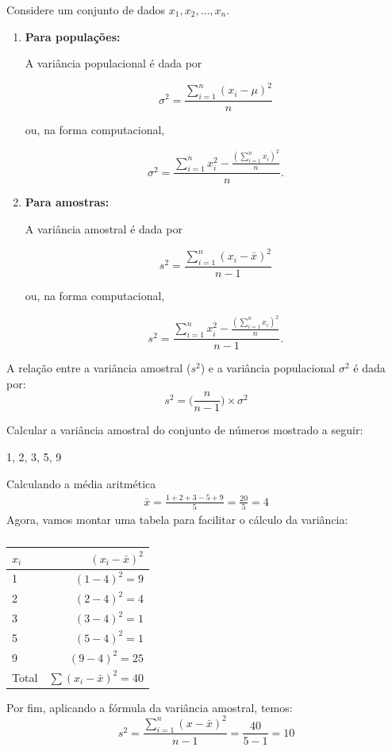 Considere um conjunto de dados 
$x_1, x_2, \dots, x_n$.

\begin{enumerate}[label=\alph*.]

\item \textbf{Para populações:}

A variância populacional é dada por

\[
\sigma^2
=
\frac{\sum_{i=1}^{n}(x_i-\mu)^2}{n}
\]

ou, na forma computacional,

\[
\sigma^2
=
\frac{
\sum_{i=1}^{n} x_i^2
-
\frac{\left(\sum_{i=1}^{n} x_i\right)^2}{n}
}{n}.
\]


\item \textbf{Para amostras:}

A variância amostral é dada por

\[
s^2
=
\frac{\sum_{i=1}^{n}(x_i-\bar{x})^2}{n-1}
\]

ou, na forma computacional,

\[
s^2
=
\frac{
\sum_{i=1}^{n} x_i^2
-
\frac{\left(\sum_{i=1}^{n} x_i\right)^2}{n}
}{n-1}.
\]

\end{enumerate}



A relação entre a variância amostral ($s^2$) e a variância populacional $\sigma^2$ é dada por:
\[
    s^2=\Bigg(\frac{n}{n-1}\Bigg)\times\sigma^2
\]
\begin{example}
    Calcular a variância amostral do conjunto de números mostrado a seguir:
    \begin{center}
        {1, 2, 3, 5, 9}
    \end{center}
    Calculando a média aritmética
    \begin{align*}
        \bar{x}=\frac{1+2+3-5+9}{5}=\frac{20}{5}=4
    \end{align*}
    Agora, vamos montar uma tabela para facilitar o cálculo da variância:

    \begin{table}[H]
    \centering
\begin{tabular}{lr}
\toprule    
$x_i$  &  $(x_i-\bar{x})^2$\\
\midrule
1 & $(1-4)^2=9$ \\
2 & $(2-4)^2=4$ \\
3 & $(3-4)^2=1$ \\
5 & $(5-4)^2=1$ \\
9 & $(9-4)^2=25$\\
\midrule
Total  & $\sum (x_i-\bar{x})^2 = 40$\\
\bottomrule
\end{tabular}
\caption{}
\label{tab:ex_calc_var}
\end{table}
Por fim, aplicando a fórmula da variância amostral, temos:
\[
      s^2= \frac{\sum_{i=1}^{n}(x-\bar{x})^2}{n-1}=\frac{40}{5-1}=10
\]
\end{example}

